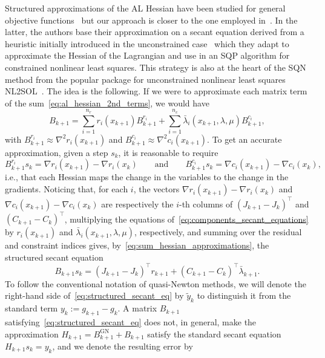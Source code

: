 \documentclass[pdflatex,sn-mathphys-num]{sn-jnl}%
\theoremstyle{thmstyleone}%
\begin{document}
Structured approximations of the AL Hessian have been studied for general objective functions~\cite{tapia:1988} but our approach is closer to the one employed in~\cite{li-etal:2002}. In the latter, the authors base their approximation on a secant equation derived from a heuristic initially introduced in the unconstrained case~\cite{biggs:1977} which they adapt to approximate the Hessian of the Lagrangian and use in an SQP algorithm for constrained nonlinear least squares. This strategy is also at the heart of the SQN method from the popular package for unconstrained nonlinear least squares NL2SOL~\cite{dennisetal:1981,dennis-etal:1989}. The idea is the following. If we were to approximate each matrix term of the sum~\eqref{eq:al_hessian_2nd_terms}, we would have
\begin{equation}\label{eq:sum_hessian_approximations}
	B_{k+1} = \sum_{i=1}^{n_r}  r_i(x_{k+1}) B^{r_i}_{k+1} + \sum_{i=1}^{n_c} \bar{\lambda}_i(x_{k+1},\lambda,\mu) B^{c_i}_{k+1},
\end{equation}
with $B^{r_i}_{k+1} \approx \nabla^2r_i(x_{k+1})$ and $B^{c_i}_{k+1} \approx  \nabla^2 c_i(x_{k+1})$. To get an accurate approximation, given a step $s_k$, it is reasonable to require
\begin{equation}\label{eq:components_secant_equations}
	B^{r_i}_{k+1}s_k = \nabla r_i(x_{k+1}) - \nabla r_i(x_k) \qquad \text{and} \qquad B^{c_i}_{k+1}s_k = \nabla c_i(x_{k+1}) - \nabla c_i(x_k),
\end{equation}
i.e., that each Hessian maps the change in the variables to the change in the gradients. Noticing that, for each $i$, the vectors $\nabla r_i(x_{k+1}) - \nabla r_i(x_k)$ and $\nabla c_i(x_{k+1}) - \nabla c_i(x_k)$ are respectively the $i$-th columns of $\left(J_{k+1}-J_k\right)^\top$ and $\left(C_{k+1}-C_k\right)^\top$, multiplying the equations of~\eqref{eq:components_secant_equations} by $r_i(x_{k+1})$ and $\bar{\lambda}_i(x_{k+1},\lambda,\mu)$, respectively, and summing over the residual and constraint indices gives, by~\eqref{eq:sum_hessian_approximations}, the structured secant equation
\begin{equation}\label{eq:structured_secant_eq}
	B_{k+1}s_k = \left(J_{k+1}-J_k\right)^\top r_{k+1} + \left(C_{k+1}-C_k\right)^\top\bar{\lambda}_{k+1}.
\end{equation}
To follow the conventional notation of quasi-Newton methods, we will denote the right-hand side of~\eqref{eq:structured_secant_eq} by $\tilde{y}_k$ to distinguish it from the standard term $y_k:= g_{k+1}-g_k$. A matrix $B_{k+1}$ satisfying~\eqref{eq:structured_secant_eq} does not, in general, make the approximation $H_{k+1} = B^{\mathrm{GN}}_{k+1} + B_{k+1}$ satisfy the standard secant equation $H_{k+1}s_k = y_k$, and we denote the resulting error by
\end{document}
